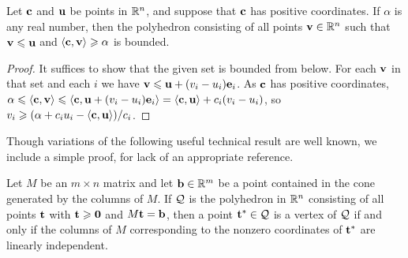 \documentclass[11pt]{amsart}
\begin{document}
\begin{proposition}
   \label{bounded polytope: P}
   Let $\mathbf{c}$ and $\mathbf{u}$ be points in $\mathbb{R}^n$, and suppose that $\mathbf{c}$ has positive coordinates.
   If $\alpha$ is any real number, then the polyhedron consisting of all points $\mathbf{v} \in \mathbb{R}^n$ such that  $\mathbf{v} \leqslant \mathbf{u}$ and $\langle \mathbf{c}, \mathbf{v} \rangle \geqslant \alpha$ is bounded.
\end{proposition}

\begin{proof}
   It suffices to show that the given set is bounded from below.
   For each $\mathbf{v}$ in that set and each $i$ we have $\mathbf{v}\leqslant \mathbf{u} + (v_i - u_i)\mathbf{e}_i$.
   As $\mathbf{c}$ has positive coordinates, $\alpha\leqslant \langle \mathbf{c}, \mathbf{v} \rangle\leqslant \langle \mathbf{c}, \mathbf{u} + (v_i -u_i)\mathbf{e}_i \rangle =
  \langle \mathbf{c}, \mathbf{u} \rangle + c_i(v_i - u_i)$, so $v_i \geqslant (\alpha + c_iu_i - \langle \mathbf{c}, \mathbf{u} \rangle)/c_i$.
\end{proof}

Though variations of the following useful technical result are well known, we include a simple proof, for lack of an appropriate reference.

\begin{proposition}
\label{vertex: P}
Let $M$ be an $m \times n$ matrix and let $\mathbf{b} \in \mathbb{R}^m$ be a point contained in the cone generated by the columns of $M$.  If $\mathcal{Q}$ is the polyhedron in $\mathbb{R}^n$  consisting of all points $\mathbf{t}$ with $\mathbf{t} \geqslant \mathbf{0}$ and $M \mathbf{t} = \mathbf{b}$, then a point $\mathbf{t}^{\ast} \in \mathcal{Q}$ is a vertex of $\mathcal{Q}$ if and only if the columns of $M$ corresponding to the nonzero coordinates of $\mathbf{t}^{\ast}$ are linearly independent.  %
\end{proposition}
\end{document}
